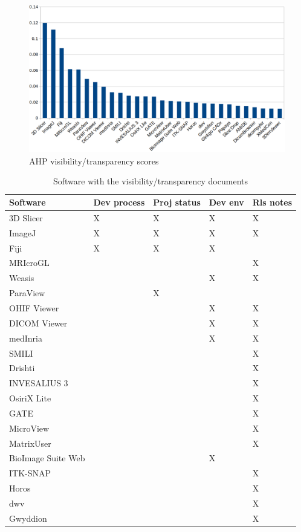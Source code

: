 \documentclass[final, 3p, times, authoryear]{elsarticle}
\begin{document}
\begin{figure}[!ht]
\includegraphics[scale=0.38]{figures/visibility_transparency_scores.png}
\caption{AHP visibility/transparency scores}
\label{fg_visibility_transparency_scores}
\end{figure}

\begin{table}[!ht]
\centering
\begin{tabular}{lllll}
\hline
Software & Dev process & Proj status & Dev env & Rls notes \\ \hline
3D Slicer & X & X & X & X \\
ImageJ & X & X & X & X \\
Fiji & X & X & X &  \\
MRIcroGL &  &  &  & X \\
Weasis &  &  & X & X \\
ParaView &  & X &  &  \\
OHIF Viewer &  &  & X & X \\
DICOM Viewer &  &  & X & X \\
medInria &  &  & X & X \\
SMILI &  &  &  & X \\
Drishti &  &  &  & X \\
INVESALIUS 3 &  &  &  & X \\
OsiriX Lite &  &  &  & X \\
GATE &  &  &  & X \\
MicroView &  &  &  & X \\
MatrixUser &  &  &  & X \\
BioImage Suite Web &  &  & X &  \\
ITK-SNAP &  &  &  & X \\
Horos &  &  &  & X \\
dwv &  &  &  & X \\
Gwyddion &  &  &  & X \\ \hline
\end{tabular}
\caption{\label{tab_Visibility/Transparency_docs}Software with the visibility/transparency documents}
\end{table}
\end{document}
